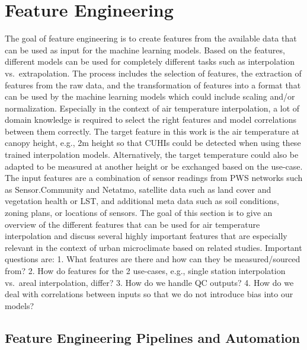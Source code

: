 \section{Feature Engineering}
\label{sec:feature_engineering}

The goal of feature engineering is to create features from the available data that can be used as input for the machine learning models. Based on the features, different models can be used for completely different tasks such as interpolation vs.\ extrapolation. The process includes the selection of features, the extraction of features from the raw data, and the transformation of features into a format that can be used by the machine learning models which could include scaling and/or normalization. Especially in the context of air temperature interpolation, a lot of domain knowledge is required to select the right features and model correlations between them correctly. The target feature in this work is the air temperature at canopy height, e.g., 2m height so that CUHIs could be detected when using these trained interpolation models. Alternatively, the target temperature could also be adapted to be measured at another height or be exchanged based on the use-case.\\
The input features are a combination of sensor readings from PWS networks such as Sensor.Community and Netatmo, satellite data such as land cover and vegetation health or LST, and additional meta data such as soil conditions, zoning plans, or locations of sensors. The goal of this section is to give an overview of the different features that can be used for air temperature interpolation and discuss several highly important features that are especially relevant in the context of urban microclimate based on related studies. Important questions are: 1. What features are there and how can they be measured/sourced from? 2. How do features for the 2 use-cases, e.g., single station interpolation vs.\ areal interpolation, differ? 3. How do we handle QC outputs? 4. How do we deal with correlations between inputs so that we do not introduce bias into our models?

\subsection{Feature Engineering Pipelines and Automation}

